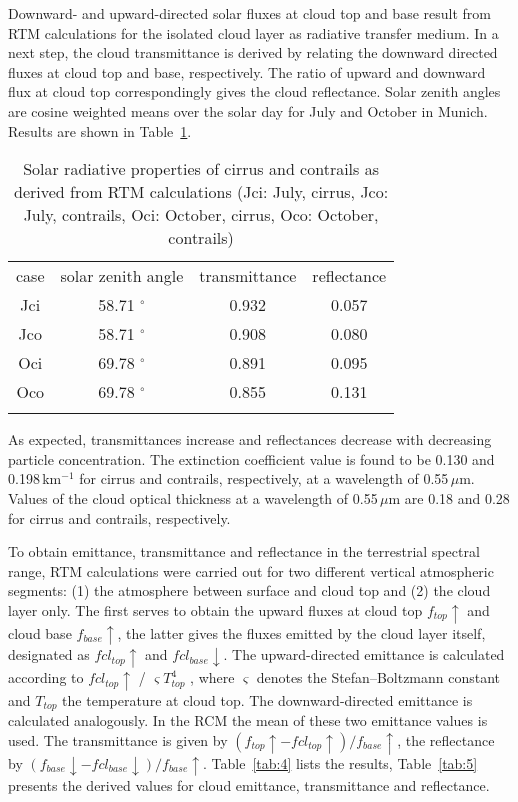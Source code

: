 \documentclass[agp]{svjour}
\begin{document}
Downward- and upward-directed solar fluxes at cloud top and base result
from RTM calculations for the isolated cloud layer as radiative transfer
medium. In a next step, the cloud transmittance is derived by relating
the downward directed fluxes at cloud top and base, respectively. The
ratio of upward and downward flux at cloud top correspondingly gives the
cloud reflectance. Solar zenith angles are cosine weighted means over
the solar day for July and October in Munich. Results are shown in
Table~\ref{tab:3}.

\begin{table}
\caption{Solar radiative properties of cirrus and contrails as derived from
RTM calculations (Jci: July, cirrus, Jco: July, contrails, Oci: October,
cirrus, Oco: October, contrails)}
\begin{tabular*}{84.22mm}{@{\hspace{0pt}\extracolsep{\fill}}cccc@{\hspace{0pt}}}
\hline
\noalign{\smallskip}
case & solar zenith angle & transmittance & reflectance \\
\noalign{\smallskip}
\hline
\noalign{\smallskip}
Jci & 58.71 $^{\circ}$ &0.932 & 0.057 \\
Jco & 58.71 $^{\circ}$ &0.908 & 0.080 \\
Oci & 69.78 $^{\circ}$ &0.891 & 0.095 \\
Oco & 69.78 $^{\circ}$ &0.855 & 0.131 \\
\noalign{\smallskip}
\hline
\end{tabular*}
\label{tab:3}
\end{table}

As expected, transmittances increase and reflectances decrease with
decreasing particle concentration. The extinction coefficient value is
found to be 0.130 and 0.198\,km$^{-1}$ for cirrus and contrails,
respectively, at a wavelength of 0.55\,$\mu$m. Values of the cloud
optical thickness at a wavelength of 0.55\,$\mu$m are 0.18 and 0.28 for
cirrus and contrails, respectively.

To obtain emittance, transmittance and reflectance in the terrestrial
spectral range, RTM calculations were carried out for two different
vertical atmospheric segments: (1) the atmosphere between surface and
cloud top and (2) the cloud layer only. The first serves to obtain the
upward fluxes at cloud top $f_{top} \uparrow $ and cloud base $f_{base}
\uparrow $, the latter gives the fluxes emitted by the cloud layer
itself, designated as $fcl_{top} \uparrow $ and $fcl_{base} \downarrow
$. The upward-directed emittance is calculated according to $fcl_{top}
\uparrow $ / $\varsigma T_{top}^4$ , where $\varsigma$ denotes the
Stefan--Boltzmann constant and $T_{top}$ the temperature at cloud top.
The downward-directed emittance is calculated analogously. In the RCM
the mean of these two emittance values is used. The transmittance is
given by $(f_{top} \uparrow - fcl_{top} \uparrow )/f_{base} \uparrow$,
the reflectance by $( f_{base} \downarrow - fcl_{base} \downarrow
)/f_{base} \uparrow$. Table~\ref{tab:4} lists the results, Table~\ref{tab:5}
presents the derived values for cloud emittance, transmittance and
reflectance.
\end{document}
